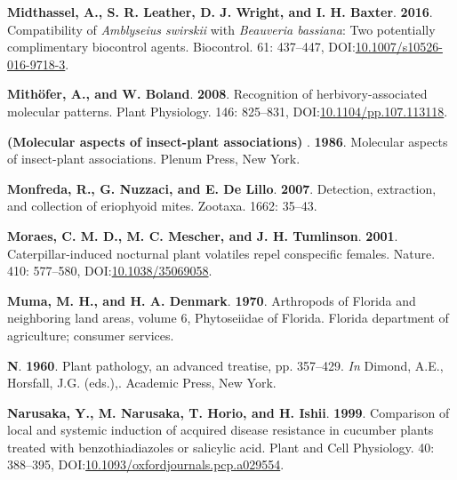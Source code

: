 \documentclass[12pt,final,CPage]{ufthesis}
\newlength{\cslhangindent}
\newenvironment{CSLReferences}[2] %
{%
	\setlength{\parindent}{0pt}
	\ifodd #1 \everypar{\setlength{\hangindent}{\cslhangindent}}\ignorespaces\fi
	\ifnum #2 > 0
	\setlength{\parskip}{#2\baselineskip}
	\fi
}%
{}
\begin{document}
{\begin{CSLReferences}{1}{0}
  \leavevmode{}%
  \textbf{Midthassel, A., S. R. Leather, D. J. Wright, and I. H. Baxter}. \textbf{2016}. Compatibility of {\emph{Amblyseius swirskii}} with {\emph{Beauveria bassiana}}: Two potentially complimentary biocontrol agents. Biocontrol. 61: 437--447, DOI:\href{https://doi.org/10.1007/s10526-016-9718-3}{10.1007/s10526-016-9718-3}.

  \leavevmode{}%
  \textbf{Mithöfer, A., and W. Boland}. \textbf{2008}. Recognition of herbivory-associated molecular patterns. Plant Physiology. 146: 825--831, DOI:\href{https://doi.org/10.1104/pp.107.113118}{10.1104/pp.107.113118}.

  \leavevmode{}%
  \textbf{(Molecular aspects of insect-plant associations) }. \textbf{1986}. Molecular aspects of insect-plant associations. Plenum Press, New York.

  \leavevmode{}%
  \textbf{Monfreda, R., G. Nuzzaci, and E. De Lillo}. \textbf{2007}. Detection, extraction, and collection of eriophyoid mites. Zootaxa. 1662: 35--43.

  \leavevmode{}%
  \textbf{Moraes, C. M. D., M. C. Mescher, and J. H. Tumlinson}. \textbf{2001}. Caterpillar-induced nocturnal plant volatiles repel conspecific females. Nature. 410: 577--580, DOI:\href{https://doi.org/10.1038/35069058}{10.1038/35069058}.

  \leavevmode{}%
  \textbf{Muma, M. H., and H. A. Denmark}. \textbf{1970}. Arthropods of {Florida} and neighboring land areas, volume 6, {Phytoseiidae} of {Florida}. Florida department of agriculture; consumer services.

  \leavevmode{}%
  \textbf{N}. \textbf{1960}. Plant pathology, an advanced treatise, pp. 357--429. \emph{In} Dimond, A.E., Horsfall, J.G. (eds.),. Academic Press, New York.

  \leavevmode{}%
  \textbf{Narusaka, Y., M. Narusaka, T. Horio, and H. Ishii}. \textbf{1999}. Comparison of local and systemic induction of acquired disease resistance in cucumber plants treated with benzothiadiazoles or salicylic acid. Plant and Cell Physiology. 40: 388--395, DOI:\href{https://doi.org/10.1093/oxfordjournals.pcp.a029554}{10.1093/oxfordjournals.pcp.a029554}.


\end{CSLReferences}}
\end{document}
